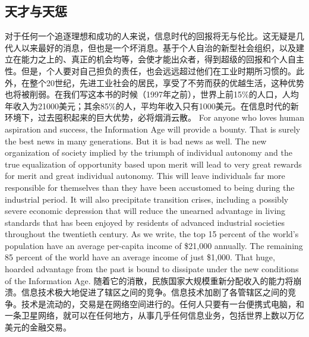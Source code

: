 \subsection{天才与天惩}
\begin{paracol}{2}[]
对于任何一个追逐理想和成功的人来说，信息时代的回报将无与伦比。这无疑是几代人以来最好的消息，但也是一个坏消息。基于个人自治的新型社会组织，以及建立在能力之上的、真正的机会均等，会使才能出众者，得到超级的回报和个人自主性。但是，个人要对自己担负的责任，也会远远超过他们在工业时期所习惯的。此外，在整个20世纪，先进工业社会的居民，享受了不劳而获的优越生活，这种优势也将被削弱。在我们写这本书的时候（1997年之前），世界上前15\%的人口，人均年收入为21000美元；其余85\%的人，平均年收入只有1000美元。在信息时代的新环境下，过去囤积起来的巨大优势，必将烟消云散。
\switchcolumn
For anyone who loves human aspiration and success, the Information Age will provide a bounty. That is surely the best news in many generations. But it is bad news as well. The new organization of society implied by the triumph of individual autonomy and the true equalization of opportunity based upon merit will lead to very great rewards for merit and great individual autonomy. This will leave individuals far more responsible for themselves than they have been accustomed to being during the industrial period. It will also precipitate transition crises, including a possibly severe economic depression that will reduce the unearned advantage in living standards that has been enjoyed by residents of advanced industrial societies throughout the twentieth century.  As we write, the top 15 percent of the world's population have an average per-capita income of \$21,000 annually. The remaining 85 percent of the world have an average income of just \$1,000. That huge, hoarded advantage from the past is bound to dissipate under the new conditions of the Information Age. 
\switchcolumn*
随着它的消散，民族国家大规模重新分配收入的能力将崩溃。信息技术极大地促进了辖区之间的竞争。信息技术加剧了各管辖区之间的竞争。技术是流动的，交易是在网络空间进行的。任何人只要有一台便携式电脑，和一条卫星网络，就可以在任何地方，从事几乎任何信息业务，包括世界上数以万亿美元的金融交易。 
\switchcolumn
{}

\end{paracol}
